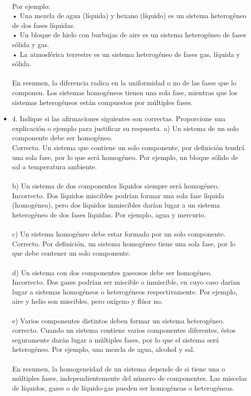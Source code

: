 \documentclass{article}
\begin{document}
\begin{itemize}
\\
Por ejemplo:\\
• Una mezcla de agua (líquida) y hexano (líquido) es un sistema heterogéneo de dos fases líquidas.\\
• Un bloque de hielo con burbujas de aire es un sistema heterogéneo de fases sólida y gas.\\
• La atmosférica terrestre es un sistema heterogéneo de fases gas, líquida y sólida.\\
\\
En resumen, la diferencia radica en la uniformidad o no de las fases que lo componen. Los sistemas homogéneos tienen una sola fase, mientras que los sistemas heterogéneos están compuestos por múltiples fases.\\
\item{4. Indique si las afirmaciones siguientes son correctas. Proporcione una explicación o ejemplo para
justificar su respuesta. }
a) Un sistema de un solo componente debe ser homogéneo.\\
Correcto. Un sistema que contiene un solo componente, por definición tendrá una sola fase, por lo que será homogéneo. Por ejemplo, un bloque sólido de sal a temperatura ambiente.\\
\\
b) Un sistema de dos componentes líquidos siempre será homogéneo.\\
Incorrecto. Dos líquidos miscibles podrían formar una sola fase líquida (homogénea), pero dos líquidos inmiscibles darían lugar a un sistema heterogéneo de dos fases líquidas. Por ejemplo, agua y mercurio.\\
\\
c) Un sistema homogéneo debe estar formado por un solo componente.\\
Correcto. Por definición, un sistema homogéneo tiene una sola fase, por lo que debe contener un solo componente.\\
\\
d) Un sistema con dos componentes gaseosos debe ser homogéneo.\\
Incorrecto. Dos gases podrían ser miscible o inmiscible, en cuyo caso darían lugar a sistemas homogéneos o heterogéneos respectivamente. Por ejemplo, aire y helio son miscibles, pero oxígeno y flúor no.\\
\\
e) Varios componentes distintos deben formar un sistema heterogéneo.\\
correcto. Cuando un sistema contiene varios componentes diferentes, éstos seguramente darán lugar a múltiples fases, por lo que el sistema será heterogéneo. Por ejemplo, una mezcla de agua, alcohol y sal.\\
\\
En resumen, la homogeneidad de un sistema depende de si tiene una o múltiples fases, independientemente del número de componentes. Las miscelas de líquidos, gases o de líquido-gas pueden ser homogéneas o heterogéneas.\\


\end{itemize}
\end{document}
